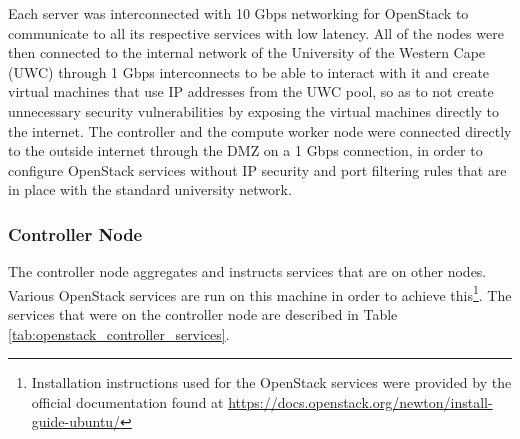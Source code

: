 Each server was interconnected with 10 Gbps networking for OpenStack to communicate to all its respective services with low latency. All of the nodes were then connected to the internal network of the University of the Western Cape (UWC) through 1 Gbps interconnects to be able to interact with it and create virtual machines that use IP addresses from the UWC pool, so as to not create unnecessary security vulnerabilities by exposing the virtual machines directly to the internet. The controller and the compute worker node were connected directly to the outside internet through the DMZ on a 1 Gbps connection, in order to configure OpenStack services without IP security and port filtering rules that are in place with the standard university network.

\subsubsection{Controller Node}

The controller node aggregates and instructs services that are on other nodes. Various OpenStack services are run on this machine in order to achieve this\footnote{Installation instructions used for the OpenStack services were provided by the official documentation found at \url{https://docs.openstack.org/newton/install-guide-ubuntu/}}. The services that were on the controller node are described in Table \ref{tab:openstack_controller_services}.

